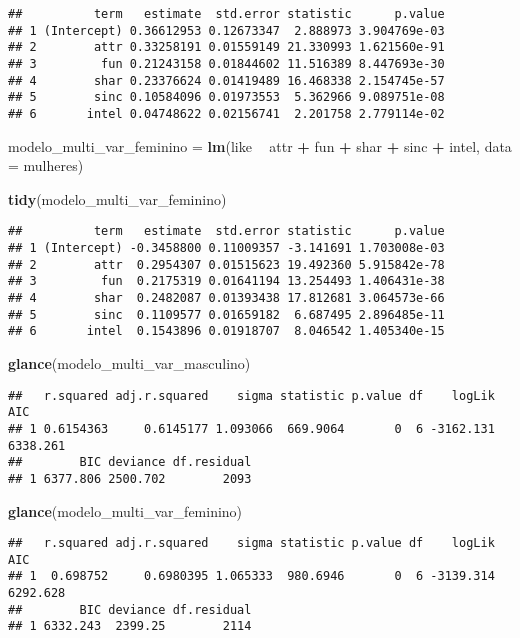 \documentclass[]{article}
\newenvironment{Shaded}{\begin{snugshade}}{\end{snugshade}}
\newcommand{\KeywordTok}[1]{\textcolor[rgb]{0.13,0.29,0.53}{\textbf{#1}}}
\newcommand{\DataTypeTok}[1]{\textcolor[rgb]{0.13,0.29,0.53}{#1}}
\newcommand{\StringTok}[1]{\textcolor[rgb]{0.31,0.60,0.02}{#1}}
\newcommand{\OperatorTok}[1]{\textcolor[rgb]{0.81,0.36,0.00}{\textbf{#1}}}
\newcommand{\NormalTok}[1]{#1}
\begin{document}
\begin{verbatim}
##          term   estimate  std.error statistic      p.value
## 1 (Intercept) 0.36612953 0.12673347  2.888973 3.904769e-03
## 2        attr 0.33258191 0.01559149 21.330993 1.621560e-91
## 3         fun 0.21243158 0.01844602 11.516389 8.447693e-30
## 4        shar 0.23376624 0.01419489 16.468338 2.154745e-57
## 5        sinc 0.10584096 0.01973553  5.362966 9.089751e-08
## 6       intel 0.04748622 0.02156741  2.201758 2.779114e-02
\end{verbatim}

\begin{Shaded}
\begin{Highlighting}[]
\NormalTok{modelo_multi_var_feminino =}\StringTok{ }\KeywordTok{lm}\NormalTok{(like }\OperatorTok{~}\StringTok{ }\NormalTok{attr }\OperatorTok{+}\StringTok{ }\NormalTok{fun }\OperatorTok{+}\StringTok{ }\NormalTok{shar }\OperatorTok{+}\StringTok{ }\NormalTok{sinc }\OperatorTok{+}\StringTok{ }\NormalTok{intel, }
               \DataTypeTok{data =}\NormalTok{ mulheres)}

\KeywordTok{tidy}\NormalTok{(modelo_multi_var_feminino)}
\end{Highlighting}
\end{Shaded}

\begin{verbatim}
##          term   estimate  std.error statistic      p.value
## 1 (Intercept) -0.3458800 0.11009357 -3.141691 1.703008e-03
## 2        attr  0.2954307 0.01515623 19.492360 5.915842e-78
## 3         fun  0.2175319 0.01641194 13.254493 1.406431e-38
## 4        shar  0.2482087 0.01393438 17.812681 3.064573e-66
## 5        sinc  0.1109577 0.01659182  6.687495 2.896485e-11
## 6       intel  0.1543896 0.01918707  8.046542 1.405340e-15
\end{verbatim}

\begin{Shaded}
\begin{Highlighting}[]
\KeywordTok{glance}\NormalTok{(modelo_multi_var_masculino)}
\end{Highlighting}
\end{Shaded}

\begin{verbatim}
##   r.squared adj.r.squared    sigma statistic p.value df    logLik      AIC
## 1 0.6154363     0.6145177 1.093066  669.9064       0  6 -3162.131 6338.261
##        BIC deviance df.residual
## 1 6377.806 2500.702        2093
\end{verbatim}

\begin{Shaded}
\begin{Highlighting}[]
\KeywordTok{glance}\NormalTok{(modelo_multi_var_feminino)}
\end{Highlighting}
\end{Shaded}

\begin{verbatim}
##   r.squared adj.r.squared    sigma statistic p.value df    logLik      AIC
## 1  0.698752     0.6980395 1.065333  980.6946       0  6 -3139.314 6292.628
##        BIC deviance df.residual
## 1 6332.243  2399.25        2114
\end{verbatim}
\end{document}
